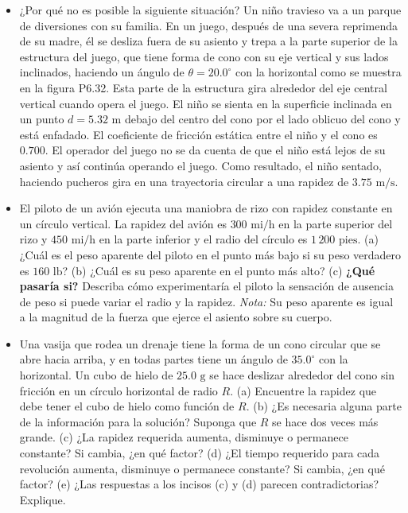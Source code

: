 \documentclass[11pt,a4paper]{article}
\begin{document}
\begin{itemize}
    \item[\textbf{32.}] ¿Por qué no es posible la siguiente situación? Un niño travieso va a un parque de diversiones con su familia. En un juego, después de una severa reprimenda de su madre, él se desliza fuera de su asiento y trepa a la parte superior de la estructura del juego, que tiene forma de cono con su eje vertical y sus lados inclinados, haciendo un ángulo de $\theta = 20.0^\circ$ con la horizontal como se muestra en la figura P6.32. Esta parte de la estructura gira alrededor del eje central vertical cuando opera el juego. El niño se sienta en la superficie inclinada en un punto $d = 5.32 \text{ m}$ debajo del centro del cono por el lado oblicuo del cono y está enfadado. El coeficiente de fricción estática entre el niño y el cono es $0.700$. El operador del juego no se da cuenta de que el niño está lejos de su asiento y así continúa operando el juego. Como resultado, el niño sentado, haciendo pucheros gira en una trayectoria circular a una rapidez de $3.75 \text{ m/s}$.
    \vspace*{7cm}

    \item[\textbf{33.}] El piloto de un avión ejecuta una maniobra de rizo con rapidez constante en un círculo vertical. La rapidez del avión es $300 \text{ mi/h}$ en la parte superior del rizo y $450 \text{ mi/h}$ en la parte inferior y el radio del círculo es $1\,200 \text{ pies}$. (a) ¿Cuál es el peso aparente del piloto en el punto más bajo si su peso verdadero es $160 \text{ lb}$? (b) ¿Cuál es su peso aparente en el punto más alto? (c) \textbf{¿Qué pasaría si?} Describa cómo experimentaría el piloto la sensación de ausencia de peso si puede variar el radio y la rapidez. \textit{Nota:} Su peso aparente es igual a la magnitud de la fuerza que ejerce el asiento sobre su cuerpo.
    \vspace*{7cm}

    \item[\textbf{34.}] Una vasija que rodea un drenaje tiene la forma de un cono circular que se abre hacia arriba, y en todas partes tiene un ángulo de $35.0^\circ$ con la horizontal. Un cubo de hielo de $25.0 \text{ g}$ se hace deslizar alrededor del cono sin fricción en un círculo horizontal de radio $R$. (a) Encuentre la rapidez que debe tener el cubo de hielo como función de $R$. (b) ¿Es necesaria alguna parte de la información para la solución? Suponga que $R$ se hace dos veces más grande. (c) ¿La rapidez requerida aumenta, disminuye o permanece constante? Si cambia, ¿en qué factor? (d) ¿El tiempo requerido para cada revolución aumenta, disminuye o permanece constante? Si cambia, ¿en qué factor? (e) ¿Las respuestas a los incisos (c) y (d) parecen contradictorias? Explique.
    \vspace*{8cm}


\end{itemize}
\end{document}
